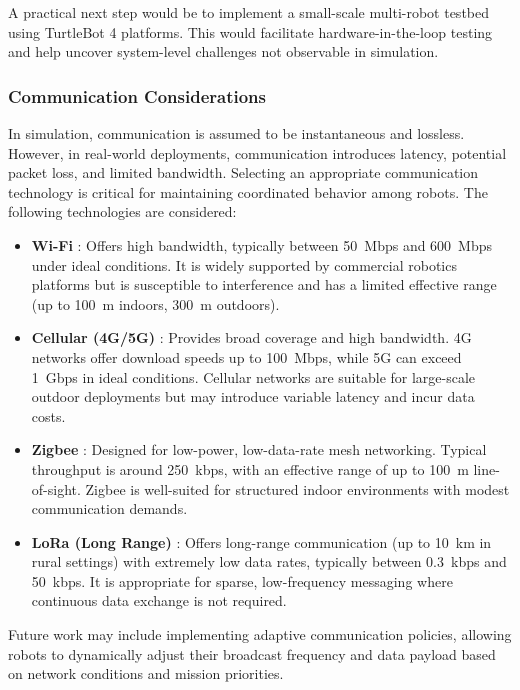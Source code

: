 A practical next step would be to implement a small-scale multi-robot testbed using TurtleBot 4 platforms. This would facilitate hardware-in-the-loop testing and help uncover system-level challenges not observable in simulation.

\subsubsection{Communication Considerations}
\label{sub:communication-methods}

In simulation, communication is assumed to be instantaneous and lossless. However, in real-world deployments, communication introduces latency, potential packet loss, and limited bandwidth. Selecting an appropriate communication technology is critical for maintaining coordinated behavior among robots. The following technologies are considered:

\begin{itemize}
  \item \textbf{Wi-Fi} \cite{wifi}: Offers high bandwidth, typically between \SI{50}{Mbps} and \SI{600}{Mbps} under ideal conditions. It is widely supported by commercial robotics platforms but is susceptible to interference and has a limited effective range (up to \SI{100}{m} indoors, \SI{300}{m} outdoors).
  \item \textbf{Cellular (4G/5G)} \cite{cellular}: Provides broad coverage and high bandwidth. 4G networks offer download speeds up to \SI{100}{Mbps}, while 5G can exceed \SI{1}{Gbps} in ideal conditions. Cellular networks are suitable for large-scale outdoor deployments but may introduce variable latency and incur data costs.
  \item \textbf{Zigbee} \cite{zigbee}: Designed for low-power, low-data-rate mesh networking. Typical throughput is around \SI{250}{kbps}, with an effective range of up to \SI{100}{m} line-of-sight. Zigbee is well-suited for structured indoor environments with modest communication demands.
  \item \textbf{LoRa (Long Range)} \cite{lora}: Offers long-range communication (up to \SI{10}{km} in rural settings) with extremely low data rates, typically between \SI{0.3}{kbps} and \SI{50}{kbps}. It is appropriate for sparse, low-frequency messaging where continuous data exchange is not required.
\end{itemize}

Future work may include implementing adaptive communication policies, allowing robots to dynamically adjust their broadcast frequency and data payload based on network conditions and mission priorities.


